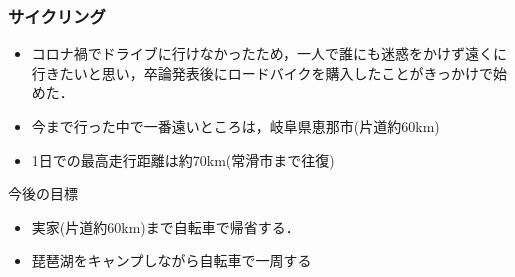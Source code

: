 \begin{frame}
    \frametitle{サイクリング}
    \begin{itemize}
        \item コロナ禍でドライブに行けなかったため，一人で誰にも迷惑をかけず遠くに行きたいと思い，卒論発表後にロードバイクを購入したことがきっかけで始めた．
        \item 今まで行った中で一番遠いところは，岐阜県恵那市(片道約60km)
        \item 1日での最高走行距離は約70km(常滑市まで往復)
    \end{itemize}
    \begin{block}{今後の目標}
        \begin{itemize}
            \item 実家(片道約60km)まで自転車で帰省する．
            \item 琵琶湖をキャンプしながら自転車で一周する
        \end{itemize}
    \end{block}
\end{frame}

